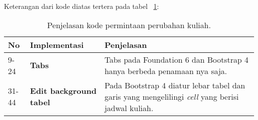 Keterangan dari kode diatas tertera pada tabel ~\ref{tabel:lst:lihatJadwalDosen}:
\begin{table}[H]
	\centering
	\begin{tabularx}{\textwidth}{llX}
		\toprule
		No & Implementasi     & Penjelasan \\
		\midrule
		9-24 & \textbf{Tabs}  & Tabs pada Foundation 6 dan Bootstrap 4 hanya berbeda penamaan nya saja.\\
		31-44 & \textbf{Edit background tabel}  & Pada Bootstrap 4 diatur lebar tabel dan garis yang mengelilingi \textit{cell} yang berisi jadwal kuliah.\\
		\bottomrule
	\end{tabularx}%
	\caption{Penjelasan kode permintaan perubahan kuliah.}
	\label{tabel:lst:lihatJadwalDosen}
\end{table}